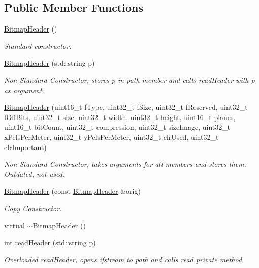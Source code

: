 \subsection*{Public Member Functions}
\begin{DoxyCompactItemize}
\item 
\mbox{\hyperlink{classBitmapHeader_a216e4a8485db7865be70c996f37e4c7d}{Bitmap\+Header}} ()
\begin{DoxyCompactList}\small\item\em Standard constructor. \end{DoxyCompactList}\item 
\mbox{\hyperlink{classBitmapHeader_a47ccc09b3e744ecc81588b034718e21a}{Bitmap\+Header}} (std\+::string p)
\begin{DoxyCompactList}\small\item\em Non-\/\+Standard Constructor, stores p in path member and calls read\+Header with p as argument. \end{DoxyCompactList}\item 
\mbox{\hyperlink{classBitmapHeader_a2ed96916f44d7b46b0ce7d05cd03cf7d}{Bitmap\+Header}} (uint16\+\_\+t f\+Type, uint32\+\_\+t f\+Size, uint32\+\_\+t f\+Reserved, uint32\+\_\+t f\+Off\+Bits, uint32\+\_\+t size, uint32\+\_\+t width, uint32\+\_\+t height, uint16\+\_\+t planes, uint16\+\_\+t bit\+Count, uint32\+\_\+t compression, uint32\+\_\+t size\+Image, uint32\+\_\+t x\+Pels\+Per\+Meter, uint32\+\_\+t y\+Pels\+Per\+Meter, uint32\+\_\+t clr\+Used, uint32\+\_\+t clr\+Important)
\begin{DoxyCompactList}\small\item\em Non-\/\+Standard Constructor, takes arguments for all members and stores them. Outdated, not used. \end{DoxyCompactList}\item 
\mbox{\hyperlink{classBitmapHeader_a25a5481f49d70a8c42a9efc17f17fd48}{Bitmap\+Header}} (const \mbox{\hyperlink{classBitmapHeader}{Bitmap\+Header}} \&orig)
\begin{DoxyCompactList}\small\item\em Copy Constructor. \end{DoxyCompactList}\item 
virtual \mbox{\hyperlink{classBitmapHeader_a4e102d5fe9a8619fca7319b148ec23d1}{$\sim$\+Bitmap\+Header}} ()
\item 
int \mbox{\hyperlink{classBitmapHeader_a2de360d5111136167f5885bed561bc8c}{read\+Header}} (std\+::string p)
\begin{DoxyCompactList}\small\item\em Overloaded read\+Header, opens ifstream to path and calls read private method. \end{DoxyCompactList}\item 

\end{DoxyCompactItemize}

